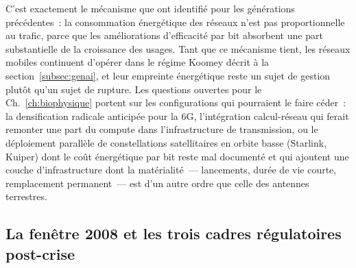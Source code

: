 %
C'est exactement le mécanisme que \textcite{mytton_network_2024} ont identifié pour les générations précédentes~: la consommation énergétique des réseaux n'est pas proportionnelle au trafic, parce que les améliorations d'efficacité par bit absorbent une part substantielle de la croissance des usages. Tant que ce mécanisme tient, les réseaux mobiles continuent d'opérer dans le régime Koomey décrit à la section~\ref{subsec:genai}, et leur empreinte énergétique reste un sujet de gestion plutôt qu'un sujet de rupture. Les questions ouvertes pour le Ch.~\ref{ch:biophysique} portent sur les configurations qui pourraient le faire céder~: la densification radicale anticipée pour la 6G, l'intégration calcul-réseau qui ferait remonter une part du compute dans l'infrastructure de transmission, ou le déploiement parallèle de constellations satellitaires en orbite basse (Starlink, Kuiper) dont le coût énergétique par bit reste mal documenté et qui ajoutent une couche d'infrastructure dont la matérialité~--- lancements, durée de vie courte, remplacement permanent~--- est d'un autre ordre que celle des antennes terrestres.


\subsection{La fenêtre 2008 et les trois cadres régulatoires post-crise}\label{subsec:fenetre_2008}

